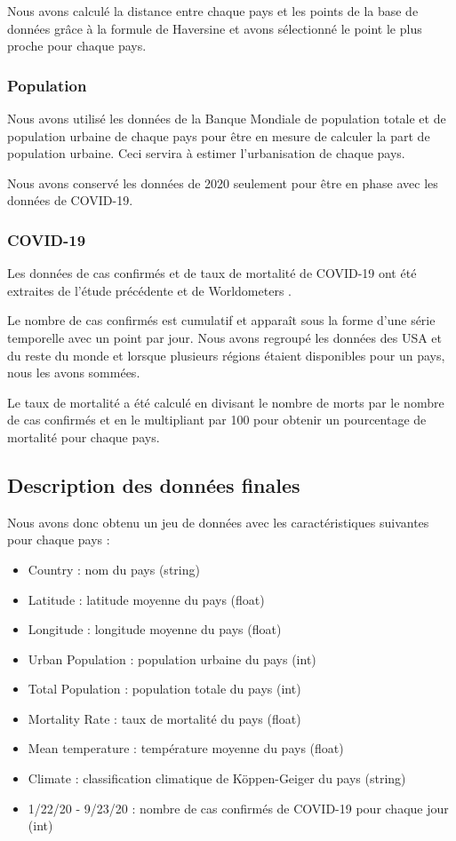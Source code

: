 \documentclass[12pt]{iEEEtran}
\begin{document}
Nous avons calculé la distance
entre chaque pays et les points de la base de données grâce à la formule de Haversine
\cite{haversine} et avons sélectionné le point le plus proche pour chaque pays.

\newpage
\subsubsection{Population}
Nous avons utilisé les données de la Banque Mondiale de population totale \cite{total_pop} et
de population urbaine \cite{urban_pop} de chaque pays pour être en mesure de calculer la part
de population urbaine. Ceci servira à estimer l'urbanisation de chaque pays.

Nous avons conservé les données de 2020 seulement pour être en phase avec les données de COVID-19.

\subsubsection{COVID-19}
Les données de cas confirmés et de taux de mortalité de COVID-19 ont été extraites de l'étude
précédente \cite{kaggle} \cite{mortality_rate} et de Worldometers \cite{mortality_website}.

Le nombre de cas confirmés est cumulatif et apparaît sous la forme d'une série temporelle
avec un point par jour. Nous avons regroupé les données des USA et du reste du monde et
lorsque plusieurs régions étaient disponibles pour un pays, nous les avons sommées.

Le taux de mortalité a été calculé en divisant le nombre de morts par le nombre de cas confirmés
et en le multipliant par 100 pour obtenir un pourcentage de mortalité pour chaque pays.

\subsection{Description des données finales}
Nous avons donc obtenu un jeu de données avec les caractéristiques suivantes pour chaque pays :
\begin{itemize}
    \item Country : nom du pays (string)
    \item Latitude : latitude moyenne du pays (float)
    \item Longitude : longitude moyenne du pays (float)
    \item Urban Population : population urbaine du pays (int)
    \item Total Population : population totale du pays (int)
    \item Mortality Rate : taux de mortalité du pays (float)
    \item Mean temperature : température moyenne du pays (float)
    \item Climate : classification climatique de Köppen-Geiger du pays (string)
    \item 1/22/20 - 9/23/20 : nombre de cas confirmés de COVID-19 pour chaque jour (int)
\end{itemize}
\end{document}
